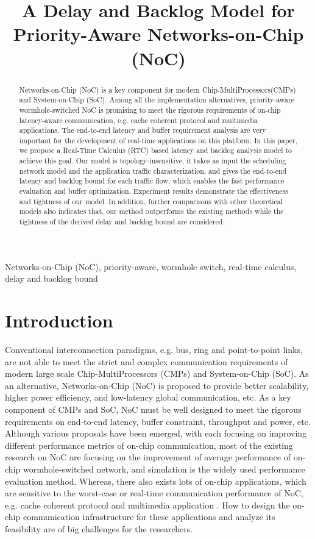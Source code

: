 \documentclass[10pt,journal]{IEEEtran}
\begin{document}
\title{A Delay and Backlog Model for Priority-Aware Networks-on-Chip (NoC)}

\author{}
\maketitle

\begin{abstract}
Networks-on-Chip (NoC) is a key component for modern Chip-MultiProcessors(CMPs) and System-on-Chip (SoC). Among all the implementation alternatives, priority-aware wormhole-switched NoC is promising to meet the rigorous requirements of on-chip latency-aware communication, e.g. cache coherent protocol and multimedia applications. The end-to-end latency and buffer requirement analysis are very important for the development of real-time applications on this platform. In this paper, we propose a Real-Time Calculus (RTC) based latency and backlog analysis model to achieve this goal. Our model is topology-insensitive, it takes as input the scheduling network model and the application traffic characterization, and gives the end-to-end latency and backlog bound for each traffic flow, which enables the fast performance evaluation and buffer optimization. Experiment results demonstrate the effectiveness and tightness of our model. In addition, further comparisons with other theoretical models also indicates that, our method outperforms the existing methods while the tightness of the derived delay and backlog bound are considered.
\end{abstract}
\begin{IEEEkeywords}
Networks-on-Chip (NoC), priority-aware, wormhole switch, real-time calculus, delay and backlog bound
\end{IEEEkeywords}

\section{Introduction}
Conventional interconnection paradigms, e.g. bus, ring and point-to-point links, are not able to meet the strict and complex communication requirements of modern large scale Chip-MultiProcessors (CMPs) and System-on-Chip (SoC). As an alternative, Networks-on-Chip (NoC) is proposed to provide better scalability, higher power efficiency, and low-latency global communication, etc. As a key component of CMPs and SoC, NoC must be well designed to meet the rigorous requirements on end-to-end latency, buffer constraint, throughput and power, etc. Although various proposals have been emerged, with each focusing on improving different performance metrics of on-chip communication, most of the existing research on NoC are focusing on the improvement of average performance of on-chip wormhole-switched network, and simulation is the widely used performance evaluation method. Whereas, there also exists lots of on-chip applications, which are sensitive to the worst-case or real-time communication performance of NoC, e.g. cache coherent protocol \cite{Bolotin2007}\cite{5951888} and multimedia application \cite{ostermann2004video}. How to design the on-chip communication infrastructure for these applications and analyze its feasibility are of big challenges for the researchers.
\end{document}

